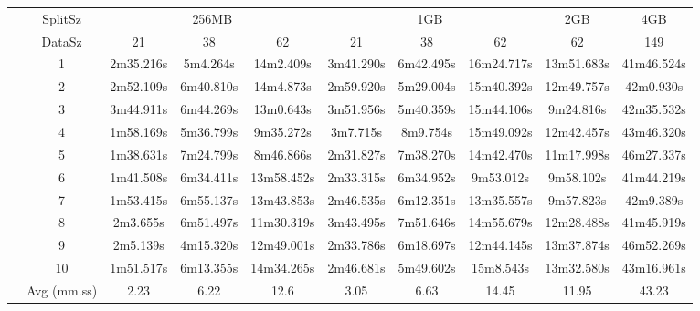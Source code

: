 \begin{tabularx}{\linewidth}{*{10}{c|}}
\cline{2-10}
& SplitSz 
& \multicolumn{3}{c|}{256MB} & \multicolumn{3}{c|}{1GB}  & \multicolumn{1}{c|}{2GB} & \multicolumn{1}{c|}{4GB} \\
\cline{2-10}
& DataSz 
& 21 & 38 & 62 & 21 & 38 & 62 & 62 & 149 \\
\cline{2-10}
& 1
& 2m35.216s & 5m4.264s & 14m2.409s & 3m41.290s & 6m42.495s & 16m24.717s & 13m51.683s & 41m46.524s \\
\cline{2-10}
& 2
& 2m52.109s & 6m40.810s & 14m4.873s & 2m59.920s & 5m29.004s & 15m40.392s & 12m49.757s & 42m0.930s \\
\cline{2-10}
& 3
& 3m44.911s & 6m44.269s & 13m0.643s & 3m51.956s & 5m40.359s & 15m44.106s & 9m24.816s & 42m35.532s \\
\cline{2-10}
& 4
& 1m58.169s & 5m36.799s & 9m35.272s & 3m7.715s & 8m9.754s & 15m49.092s & 12m42.457s & 43m46.320s \\
\cline{2-10}
& 5
& 1m38.631s & 7m24.799s & 8m46.866s & 2m31.827s & 7m38.270s & 14m42.470s & 11m17.998s & 46m27.337s \\
\cline{2-10}
& 6
& 1m41.508s & 6m34.411s & 13m58.452s & 2m33.315s & 6m34.952s & 9m53.012s & 9m58.102s & 41m44.219s \\
\cline{2-10}
& 7
& 1m53.415s & 6m55.137s & 13m43.853s & 2m46.535s & 6m12.351s & 13m35.557s & 9m57.823s & 42m9.389s \\
\cline{2-10}
& 8
& 2m3.655s & 6m51.497s & 11m30.319s & 3m43.495s & 7m51.646s & 14m55.679s & 12m28.488s & 41m45.919s \\
\cline{2-10}
& 9
& 2m5.139s & 4m15.320s & 12m49.001s & 2m33.786s & 6m18.697s & 12m44.145s & 13m37.874s & 46m52.269s \\
\cline{2-10}
& 10
& 1m51.517s & 6m13.355s & 14m34.265s & 2m46.681s & 5m49.602s & 15m8.543s & 13m32.580s & 43m16.961s \\
\cline{2-10}
& Avg (mm.ss)
& 2.23 & 6.22 & 12.6 & 3.05 & 6.63 & 14.45 & 11.95 & 43.23 \\
\cline{2-10}
\end{tabularx}
